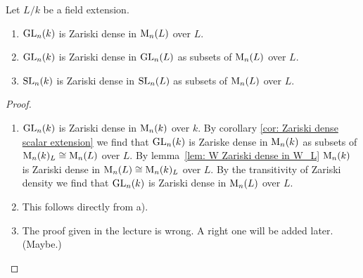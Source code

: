 \begin{prop}
  Let $L/k$ be a field extension.
  \begin{enumerate}[label=\emph{\alph*)},leftmargin=*]
    \item
      $\operatorname{GL}_n(k)$ is Zariski dense in $\operatorname{M}_n(L)$ over $L$.
    \item
      $\operatorname{GL}_n(k)$ is Zariski dense in $\operatorname{GL}_n(L)$ as subsets of $\operatorname{M}_n(L)$ over $L$.
    \item
      $\operatorname{SL}_n(k)$ is Zariski dense in $\operatorname{SL}_n(L)$ as subsets of $\operatorname{M}_n(L)$ over $L$.
  \end{enumerate}
\end{prop}
\begin{proof}
  \begin{enumerate}[label=\emph{\alph*)},leftmargin=*]
    \item
      $\operatorname{GL}_n(k)$ is Zariski dense in $\operatorname{M}_n(k)$ over $k$. By corollary \ref{cor: Zariski dense scalar extension} we find that $\operatorname{GL}_n(k)$ is Zariske dense in $\operatorname{M}_n(k)$ as subsets of $\operatorname{M}_n(k)_L \cong \operatorname{M}_n(L)$ over $L$. By \mbox{lemma \ref{lem: W Zariski dense in W_L}} $\operatorname{M}_n(k)$ is Zariski dense in $\operatorname{M}_n(L) \cong \operatorname{M}_n(k)_L$ over $L$. By the transitivity of Zariski density we find that $\operatorname{GL}_n(k)$ is Zariski dense in $\operatorname{M}_n(L)$ over $L$.
    \item
      This follows directly from a).
    \item
      The proof given in the lecture is wrong. A right one will be added later. (Maybe.)
    \qedhere
  \end{enumerate}
\end{proof}


